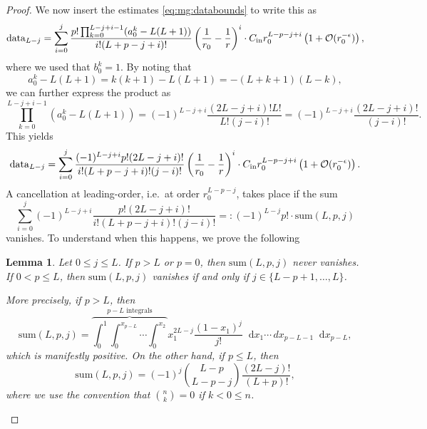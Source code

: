 \documentclass[11pt,english]{article}
\numberwithin{equation}{section}
\newtheorem{lemma}{Lemma}[section]
\theoremstyle{remark}
\theoremstyle{plain}
\theoremstyle{remark}
\newcommand{\dd}{\mathop{}\!\mathrm{d}}
\renewcommand{\(}{\left(}
\renewcommand{\)}{\right)}
\begin{document}
\begin{proof}
We now insert the estimates \eqref{eq:mg:databounds} to write this as
\begin{equation}
\mathrm{data}_{L-j}=\sum_{i=0}^j  \frac{p!\prod_{k=0}^{L-j+i-1}(a_0^k-L(L+1))}{i!(L+p-j+i)!}\left(\frac{1}{r_0}-\frac{1}{r}\right)^i\cdot	C_{\mathrm{in}} r_0^{L-p-j+i}\left(1+\mathcal{O}(r_0^{-\epsilon})\right),
\end{equation}
where we used that $b_0^k=1$. By noting that
\begin{equation*}
a_0^k-L(L+1)=k(k+1)-L(L+1)=-(L+k+1)(L-k), 
\end{equation*}
we can further express the product as
\begin{equation}\label{eq:mg:product}
\prod_{k=0}^{L-j+i-1}(a_0^k-L(L+1))=(-1)^{L-j+i}\frac{(2L-j+i)!L!}{L!(j-i)!}=(-1)^{L-j+i}\frac{(2L-j+i)!}{(j-i)!}.
\end{equation}
This yields
\begin{multline}\label{eq:mg:datalj}
\mathrm{data}_{L-j}=\sum_{i=0}^j \frac{ (-1)^{L-j+i}p!(2L-j+i)!}{i!(L+p-j+i)!(j-i)!}\left(\frac{1}{r_0}-\frac{1}{r}\right)^i	\cdot	C_{\mathrm{in}} r_0^{L-p-j+i}\left(1+\mathcal{O}(r_0^{-\epsilon})\right).
\end{multline}
A cancellation at leading-order, i.e.\ at order $r_0^{L-p-j}$, takes place if the sum
\begin{equation}
\sum_{i=0}^j (-1)^{L-j+i} \frac{p!(2L-j+i)!}{i!(L+p-j+i)!(j-i)!}=:(-1)^{L-j}p!\cdot \mathrm{sum}(L,p,j)
\end{equation}
vanishes. To understand when this happens, we prove the following
\begin{lemma}\label{prop10}
Let $0\leq j\leq L$.
If $p>L$ {or $p=0$}, then $\mathrm{sum}(L,p,j)$ never vanishes.
If $0<p\leq L$, then $\mathrm{sum}(L,p,j)$ vanishes if and only if $j\in\{L-p+1,\dots,L\}$.

More precisely, if $p>L$, then
\begin{equation}\label{eq:prop101}
\mathrm{sum}(L,p,j)=\overbrace{\int_0^1\int_0^{x_{p-L}}\cdots\int_{0}^{x_{2}}}^{p-L \text{ integrals}}x_{1}^{2L-j}\frac{(1-x_{1})^j}{j!}\dd x_{1}\cdots\, dx_{p-L-1}\dd x_{p-L},
\end{equation}
which is manifestly positive. On the other hand, if $p\leq L$, then
\begin{equation}\label{eq:prop102}
\mathrm{sum}(L,p,j)=(-1)^j\binom{L-p}{L-p-j}\frac{(2L-j)!}{(L+p)!}, 
\end{equation}
where we use the convention that $\binom{n}{k}=0$ if $k<0\leq n$. 


\end{lemma}
\end{proof}
\end{document}
